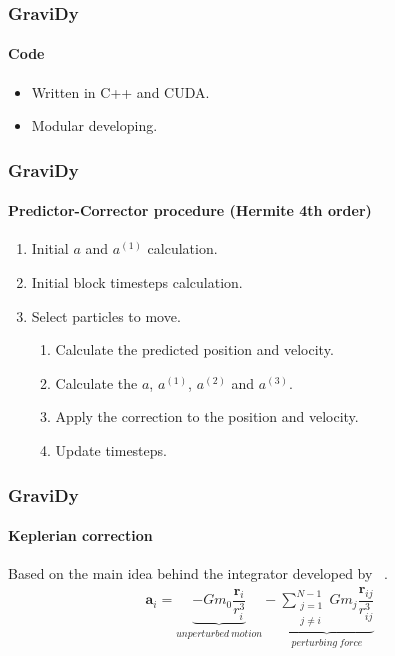 \begin{frame}
    \frametitle{GraviDy}
    \framesubtitle{Code}
    \begin{itemize}
        \item Written in C++ and CUDA.
        \item Modular developing.
    \end{itemize}
\end{frame}

\begin{frame}
    \frametitle{GraviDy}
    \framesubtitle{Predictor-Corrector procedure (Hermite 4th order)}
    \begin{enumerate}
        \item Initial $a$ and $a^{(1)}$ calculation.
        \item Initial block timesteps calculation.
        \item Select particles to move.
        \begin{enumerate}
            \item Calculate the predicted position and velocity.
            \item Calculate the $a$, $a^{(1)}$, $a^{(2)}$ and $a^{(3)}$.
            \item Apply the correction to the position and velocity.
            \item Update timesteps.
        \end{enumerate}
    \end{enumerate}
\end{frame}

\begin{frame}[fragile]
    \frametitle{GraviDy}
    \framesubtitle{Keplerian correction}
    Based on the main idea behind the integrator developed by ~\cite{2006IAUJD...6E..24L}.
    \begin{eqnarray}
        \boldsymbol{a}_{i} =   \underbrace{ - G m_{0}
                                          \dfrac{\boldsymbol{r}_{i}}{r_{i}^{3}}
                                          }_{unperturbed\ motion}
                             - \underbrace{ \sum\limits_{\substack{j=1\\j\neq i}}^{N-1}
                                            G m_{j} \dfrac{\boldsymbol{r}_{ij}}{r_{ij}^{3}}
                                          }_{perturbing\ force}
    \end{eqnarray}
\end{frame}

